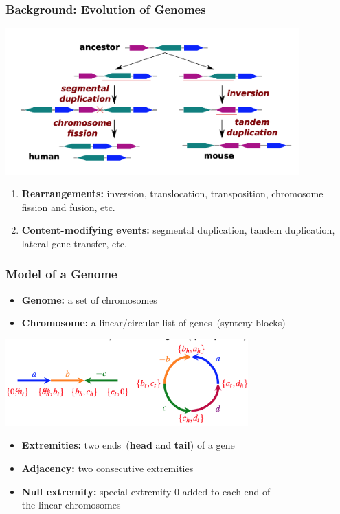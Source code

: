 \documentclass[mathserif]{beamer}
\begin{document}
\frame
{
	\frametitle{Background: Evolution of Genomes}

	\begin{center}
		\includegraphics[width=0.85\textwidth]{L8-DCJ1.png}
	\end{center}


	\begin{enumerate}
	\item<1-> {\bf Rearrangements:} inversion, translocation, transposition, chromosome fission and fusion, etc.

	\vspace{0.1cm}

	\item<1-> {\bf Content-modifying events:} segmental duplication, tandem duplication, lateral gene transfer, etc.
	\end{enumerate}

}

\frame
{
	\frametitle{Model of a Genome}
	\vspace{-0.4cm}
	\begin{itemize}
	\item {\bf Genome:} a set of chromosomes
	\item {\bf Chromosome:} a linear/circular list of genes~(synteny blocks)
	\end{itemize}

	\begin{center}
		\includegraphics[width=0.7\textwidth]{L8-DCJ2.png}
	\end{center}

	\begin{itemize}
	\item<1-> {\bf Extremities:} two ends~({\bf head} and {\bf tail}) of a gene
	\item<1-> {\bf Adjacency:} two consecutive extremities
	\item<1-> {\bf Null extremity:} special extremity $0$ added to each end of\\ the linear chromosomes
	\end{itemize}
}
\end{document}
